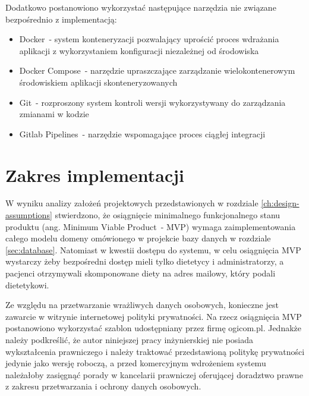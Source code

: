 \par
Dodatkowo postanowiono wykorzystać następujące narzędzia nie związane bezpośrednio z implementacją:
\begin{itemize}
    \item Docker\cite{tech:docker}~- system konteneryzacji pozwalający uprościć proces wdrażania aplikacji z wykorzystaniem konfiguracji niezależnej od środowiska
    \item Docker Compose\cite{tech:docker-compose}~- narzędzie upraszczające zarządzanie wielokontenerowym środowiskiem aplikacji skonteneryzowanych
    \item Git\cite{tech:git}~- rozproszony system kontroli wersji wykorzystywany do zarządzania zmianami w kodzie
    \item Gitlab Pipelines\cite{tech:gitlab-pipelines}~- narzędzie wspomagające proces ciągłej integracji
\end{itemize}

\section{Zakres implementacji}\label{sec:implementation-scope}

W wyniku analizy założeń projektowych przedstawionych w rozdziale \ref{ch:design-assumptions} stwierdzono,
że osiągnięcie minimalnego funkcjonalnego stanu produktu (ang. Minimum Viable Product~- MVP)
wymaga zaimplementowania całego modelu domeny omówionego w projekcie bazy danych w rozdziale \ref{sec:database}.
Natomiast w kwestii dostępu do systemu, w celu osiągnięcia MVP wystarczy żeby bezpośredni dostęp mieli tylko dietetycy i administratorzy,
a pacjenci otrzymywali skomponowane diety na adres mailowy, który podali dietetykowi.

\par
Ze względu na przetwarzanie wrażliwych danych osobowych, konieczne jest zawarcie w witrynie internetowej polityki prywatności.
Na rzecz osiągnięcia MVP postanowiono wykorzystać szablon udostępniany przez firmę ogicom.pl.
Jednakże należy podkreślić, że autor niniejszej pracy inżynierskiej nie posiada wykształcenia prawniczego
i należy traktować przedstawioną politykę prywatności jedynie jako wersję roboczą,
a przed komercyjnym wdrożeniem systemu należałoby zasięgnąć porady w kancelarii prawniczej oferującej doradztwo prawne z zakresu przetwarzania i ochrony danych osobowych.


